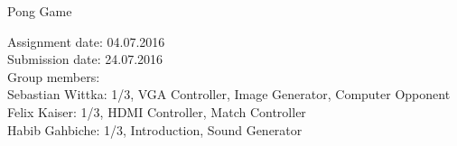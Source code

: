 \documentclass[12pt]{article}
\begin{document}
 


\thispagestyle{empty}     %
\null\vspace{40mm}
\begin{center}
{%
\LARGE  Pong Game}
\\[15mm]
\vspace{25mm}



\parbox{0.9\textwidth}{   %
\small }
\end{center}
\vfill 
\begin{center}
Assignment date: 04.07.2016
\\
Submission date: 24.07.2016
\\

Group members:\\
Sebastian Wittka: 1/3, VGA Controller, Image Generator, Computer Opponent\\
Felix Kaiser: 1/3, HDMI Controller, Match Controller\\
Habib Gahbiche: 1/3, Introduction, Sound Generator
\end{center}
\vspace{20mm}
\newpage
\tableofcontents  
\null\thispagestyle{empty} 
\newpage




	  
%

\end{document}
